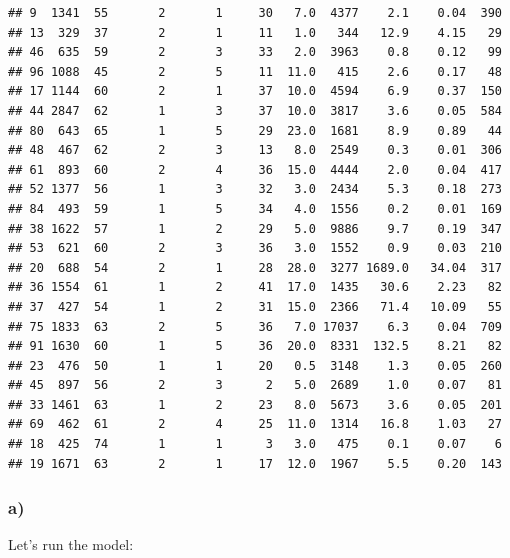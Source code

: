 \documentclass[
]{article}
\begin{document}
\begin{verbatim}
## 9  1341  55       2       1     30   7.0  4377    2.1    0.04  390
## 13  329  37       2       1     11   1.0   344   12.9    4.15   29
## 46  635  59       2       3     33   2.0  3963    0.8    0.12   99
## 96 1088  45       2       5     11  11.0   415    2.6    0.17   48
## 17 1144  60       2       1     37  10.0  4594    6.9    0.37  150
## 44 2847  62       1       3     37  10.0  3817    3.6    0.05  584
## 80  643  65       1       5     29  23.0  1681    8.9    0.89   44
## 48  467  62       2       3     13   8.0  2549    0.3    0.01  306
## 61  893  60       2       4     36  15.0  4444    2.0    0.04  417
## 52 1377  56       1       3     32   3.0  2434    5.3    0.18  273
## 84  493  59       1       5     34   4.0  1556    0.2    0.01  169
## 38 1622  57       1       2     29   5.0  9886    9.7    0.19  347
## 53  621  60       2       3     36   3.0  1552    0.9    0.03  210
## 20  688  54       2       1     28  28.0  3277 1689.0   34.04  317
## 36 1554  61       1       2     41  17.0  1435   30.6    2.23   82
## 37  427  54       1       2     31  15.0  2366   71.4   10.09   55
## 75 1833  63       2       5     36   7.0 17037    6.3    0.04  709
## 91 1630  60       1       5     36  20.0  8331  132.5    8.21   82
## 23  476  50       1       1     20   0.5  3148    1.3    0.05  260
## 45  897  56       2       3      2   5.0  2689    1.0    0.07   81
## 33 1461  63       1       2     23   8.0  5673    3.6    0.05  201
## 69  462  61       2       4     25  11.0  1314   16.8    1.03   27
## 18  425  74       1       1      3   3.0   475    0.1    0.07    6
## 19 1671  63       2       1     17  12.0  1967    5.5    0.20  143
\end{verbatim}

\subsubsection{a)}\label{a-1}

Let's run the model:
\end{document}
